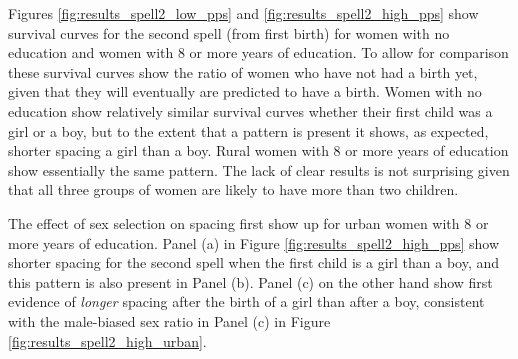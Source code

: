 \documentclass[12pt,letterpaper]{article}
\begin{document}

Figures \ref{fig:results_spell2_low_pps} and \ref{fig:results_spell2_high_pps}
show survival curves for the second spell (from first birth) for women with
no education and women with 8 or more years of education.
To allow for comparison these survival curves show the ratio of women who
have not had a birth yet, given that they will eventually are predicted to
have a birth.
Women with no education show relatively similar survival curves whether their
first child was a girl or a boy, but to the extent that a pattern is present
it shows, as expected, shorter spacing a girl than a boy.
Rural women with 8 or more years of education show essentially the same 
pattern.
The lack of clear results is not surprising given that all three groups of
women are likely to have more than two children.

The effect of sex selection on spacing first show up for urban women with
8 or more years of education.
Panel (a) in Figure \ref{fig:results_spell2_high_pps} show shorter spacing
for the second spell when the first child is a girl than a boy, and this
pattern is also present in Panel (b).
Panel (c) on the other hand show first evidence of \emph{longer} spacing 
after the birth of a girl than after a boy, consistent with the male-biased
sex ratio in Panel (c) in Figure \ref{fig:results_spell2_high_urban}.


\end{document}
